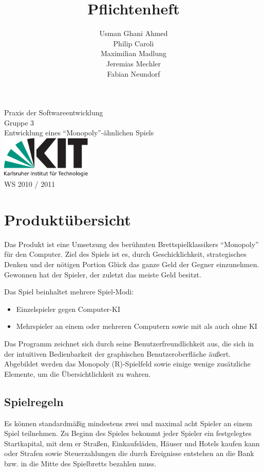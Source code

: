 \documentclass[a4paper,10pt]{article}
\title{Pflichtenheft}
\date{}
\author{Usman Ghani Ahmed \\
Philip Caroli\\
Maximilian Madlung\\ 
Jeremias Mechler\\ 
Fabian Neundorf}
\begin{document}
 
\vspace{5cm}
\maketitle
\begin{center}
\vspace{3cm}
\huge{Praxis der Softwareentwicklung \\
Gruppe 3 \\[0.5cm]
Entwicklung eines ``Monopoly''-ähnlichen Spiels \\[0.5cm]
\includegraphics[height=2cm]{kitlogo_de_rgb}  \\[0.5cm]
WS 2010 / 2011} \\[2cm]
\end{center}

\newpage

\tableofcontents

\newpage

\section{Produktübersicht}
Das Produkt ist eine Umsetzung des berühmten Brettspielklassikers ``Monopoly'' für den Computer.
Ziel des Spiels ist es, durch Geschicklichkeit, strategisches Denken und der nötigen Portion Glück das ganze Geld der Gegner einzunehmen. Gewonnen hat der Spieler, der zuletzt das meiste Geld besitzt. 

Das Spiel beinhaltet mehrere Spiel-Modi:
\begin{itemize}
\item Einzelspieler gegen Computer-KI
\item Mehrspieler an einem oder mehreren Computern sowie mit als auch ohne KI
\end{itemize}
Das Programm zeichnet sich durch seine Benutzerfreundlichkeit aus, die sich in der intuitiven Bedienbarkeit der graphischen Benutzeroberfläche äußert. Abgebildet werden das Monopoly (R)-Spielfeld sowie einige wenige zusätzliche Elemente, um die Übersichtlichkeit zu wahren. 
\subsection{Spielregeln}
Es können standardmäßig mindestens zwei und maximal acht Spieler an einem Spiel teilnehmen. Zu Beginn des Spieles bekommt jeder Spieler ein festgelegtes Startkapital, mit dem er Straßen, Einkaufsläden, Häuser und Hotels kaufen kann oder Strafen sowie Steuerzahlungen die durch Ereignisse entstehen an die Bank bzw. in die Mitte des Spielbretts bezahlen muss. 
\end{document}
